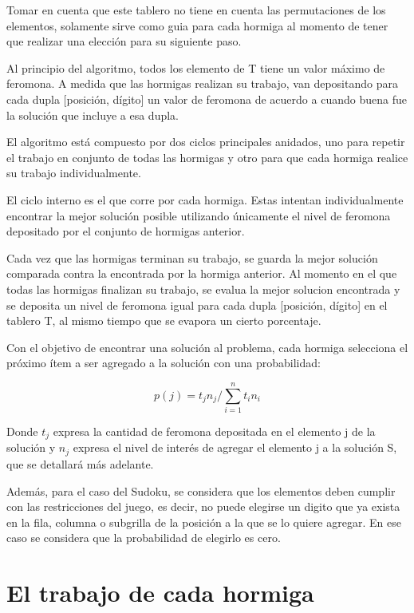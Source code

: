 \documentclass[a4paper,spanish]{article}
\begin{document}
Tomar en cuenta que este tablero no tiene en cuenta las permutaciones de los elementos, solamente sirve como guia 
para cada hormiga al momento de tener que realizar una elección para su siguiente paso.

Al principio del algoritmo, todos los elemento de T tiene un valor máximo de feromona. A medida que las hormigas
realizan su trabajo, van depositando para cada dupla [posición, dígito] un valor de feromona de acuerdo a cuando buena fue
la solución que incluye a esa dupla.

El algoritmo está compuesto por dos ciclos principales anidados, uno para repetir el trabajo en conjunto 
de todas las hormigas y otro para que cada hormiga realice su trabajo individualmente.

El ciclo interno es el que corre por cada hormiga. Estas intentan individualmente encontrar 
la mejor solución posible utilizando únicamente el nivel de feromona depositado por el conjunto de hormigas anterior. 

Cada vez que las hormigas terminan su trabajo, se guarda la mejor solución comparada contra la encontrada por la hormiga anterior. 
Al momento en el que todas las hormigas finalizan su trabajo, se evalua la mejor solucion encontrada y se deposita un nivel de 
feromona igual para cada dupla [posición, dígito] en el tablero T, al mismo tiempo que se evapora un cierto porcentaje.

Con el objetivo de encontrar una solución al problema, cada hormiga selecciona el próximo ítem 
a ser agregado a la solución con una probabilidad:

\begin{equation}
	p(j) = t_j n_j / \sum\limits_{i=1}^n t_i n_i	
\end{equation}

Donde $t_j$ expresa la cantidad de feromona depositada en el elemento j de la solución y $n_j$ expresa el nivel de interés de agregar 
el elemento j a la solución S, que se detallará más adelante.

Además, para el caso del Sudoku, se considera que los elementos deben cumplir con las restricciones del juego, es decir, 
no puede elegirse un digito que ya exista en la fila, columna o subgrilla de la posición a la que se lo quiere agregar. 
En ese caso se considera que la probabilidad de elegirlo es cero.

\section{El trabajo de cada hormiga}
\end{document}
